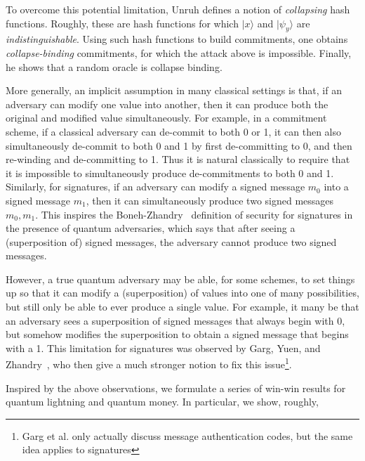 To overcome this potential limitation, Unruh defines a notion of \emph{collapsing} hash functions.  Roughly, these are hash functions for which $|x\rangle$ and $|\psi_y\rangle$ are \emph{indistinguishable}.  Using such hash functions to build commitments, one obtains \emph{collapse-binding} commitments, for which the attack above is impossible.  Finally, he shows that a random oracle is collapse binding.

More generally, an implicit assumption in many classical settings is that, if an adversary can modify one value into another, then it can produce both the original and modified value simultaneously.  For example, in a commitment scheme, if a classical adversary can de-commit to both 0 or 1, it can then also simultaneously de-commit to both 0 and 1 by first de-committing to 0, and then re-winding and de-committing to 1.  Thus it is natural classically to require that it is impossible to simultaneously produce de-commitments to both 0 and 1.  Similarly, for signatures, if an adversary can modify a signed message $m_0$ into a signed message $m_1$, then it can simultaneously produce two signed messages $m_0,m_1$.  This inspires the Boneh-Zhandry~\cite{EC:BonZha13,C:BonZha13} definition of security for signatures in the presence of quantum adversaries, which says that after seeing a (superposition of) signed messages, the adversary cannot produce two signed messages.

However, a true quantum adversary may be able, for some schemes, to set things up so that it can modify a (superposition) of values into one of many possibilities, but still only be able to ever produce a single value.  For example, it many be that an adversary sees a superposition of signed messages that always begin with 0, but somehow modifies the superposition to obtain a signed message that begins with a 1.  This limitation for signatures was observed by Garg, Yuen, and Zhandry~\cite{C:GarYueZha17}, who then give a much stronger notion to fix this issue\footnote{Garg et al. only actually discuss message authentication codes, but the same idea applies to signatures}.

\medskip

Inspired by the above observations, we formulate a series of win-win results for quantum lightning and quantum money.  In particular, we show, roughly,

